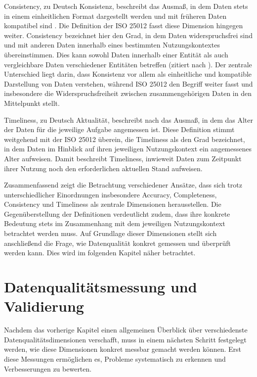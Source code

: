 \documentclass[../main.tex]{subfiles}
\begin{document}
Consistency, zu Deutsch Konsistenz, beschreibt das Ausmaß, in dem Daten stets in einem einheitlichen Format dargestellt werden und mit früheren Daten kompatibel sind \parencite{wangAccuracyWhatData1996}. Die Definition der ISO 25012 fasst diese Dimension hingegen weiter. Consistency bezeichnet hier den Grad, in dem Daten widerspruchsfrei sind und mit anderen Daten innerhalb eines bestimmten Nutzungskontextes übereinstimmen. Dies kann sowohl Daten innerhalb einer Entität als auch vergleichbare Daten verschiedener Entitäten betreffen (zitiert nach \parencite{zotero-item-22}). Der zentrale Unterschied liegt darin, dass \textcite{wangAccuracyWhatData1996} Konsistenz vor allem als einheitliche und kompatible Darstellung von Daten verstehen, während ISO 25012 den Begriff weiter fasst und insbesondere die Widerspruchsfreiheit zwischen zusammengehörigen Daten in den Mittelpunkt stellt.

Timeliness, zu Deutsch Aktualität, beschreibt nach \textcite{wangAccuracyWhatData1996} das Ausmaß, in dem das Alter der Daten für die jeweilige Aufgabe angemessen ist. Diese Definition stimmt weitgehend mit der ISO 25012 überein, die Timeliness als den Grad bezeichnet, in dem Daten im Hinblick auf ihren jeweiligen Nutzungskontext ein angemessenes Alter aufweisen. Damit beschreibt Timeliness, inwieweit Daten zum Zeitpunkt ihrer Nutzung noch den erforderlichen aktuellen Stand aufweisen.

Zusammenfassend zeigt die Betrachtung verschiedener Ansätze, dass sich trotz unterschiedlicher Einordnungen insbesondere Accuracy, Completeness, Consistency und Timeliness als zentrale Dimensionen herausstellen. Die Gegenüberstellung der Definitionen verdeutlicht zudem, dass ihre konkrete Bedeutung stets im Zusammenhang mit dem jeweiligen Nutzungskontext betrachtet werden muss. Auf Grundlage dieser Dimensionen stellt sich anschließend die Frage, wie Datenqualität konkret gemessen und überprüft werden kann. Dies wird im folgenden Kapitel näher betrachtet.


\section{Datenqualitätsmessung und Validierung}

Nachdem das vorherige Kapitel einen allgemeinen Überblick über verschiedenste Datenqualitätsdimensionen verschafft, muss in einem nächsten Schritt festgelegt werden, wie diese Dimensionen konkret messbar gemacht werden können. Erst diese Messungen ermöglichen es, Probleme systematisch zu erkennen und Verbesserungen zu bewerten.
\end{document}
